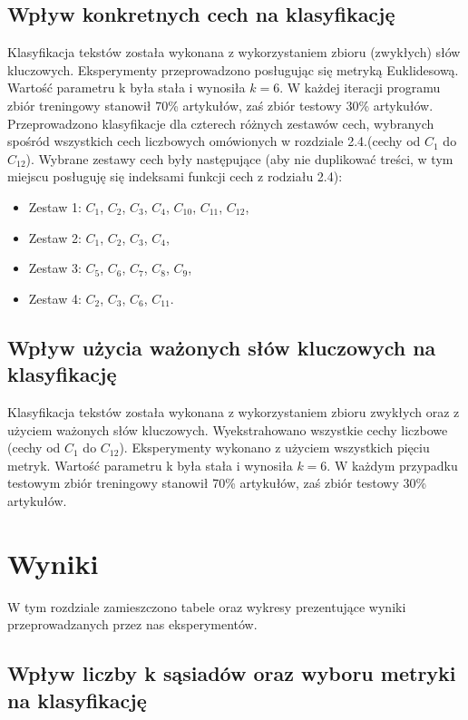 \documentclass{classrep}
\begin{document}
\subsection{Wpływ konkretnych cech na klasyfikację}
Klasyfikacja tekstów została wykonana z wykorzystaniem zbioru (zwykłych) słów kluczowych. Eksperymenty przeprowadzono posługując się metryką Euklidesową. Wartość parametru k była stała i wynosiła $k=6$. W każdej iteracji programu zbiór treningowy stanowił 70\% artykułów, zaś zbiór testowy 30\% artykułów. Przeprowadzono klasyfikacje dla czterech różnych zestawów cech, wybranych spośród wszystkich cech liczbowych omówionych w rozdziale 2.4.(cechy od $C_1$ do $C_{12}$). Wybrane zestawy cech były następujące (aby nie duplikować treści, w tym miejscu posługuję się indeksami funkcji cech z rodziału 2.4):
\begin{itemize}[label=$\bullet$\scshape\bfseries]

\item Zestaw 1: $C_{1}$,  $C_{2}$,  $C_{3}$,  $C_{4}$,  $C_{10}$,  $C_{11}$,  $C_{12}$,
\item Zestaw 2: $C_{1}$,  $C_{2}$,  $C_{3}$,  $C_{4}$,
\item Zestaw 3: $C_{5}$,  $C_{6}$,  $C_{7}$,  $C_{8}$,  $C_{9}$,
\item Zestaw 4: $C_{2}$,  $C_{3}$,  $C_{6}$,  $C_{11}$.
\end{itemize}

\subsection{Wpływ użycia ważonych słów kluczowych na klasyfikację}
Klasyfikacja tekstów została wykonana z wykorzystaniem zbioru zwykłych oraz z użyciem ważonych słów kluczowych. Wyekstrahowano wszystkie cechy liczbowe (cechy od $C_1$ do $C_{12}$). Eksperymenty wykonano z użyciem wszystkich pięciu metryk. Wartość parametru k była stała i wynosiła $k=6$. W każdym przypadku testowym zbiór treningowy stanowił 70\% artykułów, zaś zbiór testowy 30\% artykułów.

\section{Wyniki}
W tym rozdziale zamieszczono tabele oraz wykresy prezentujące wyniki przeprowadzanych przez nas eksperymentów.

\subsection{Wpływ liczby k sąsiadów oraz wyboru metryki na klasyfikację}
\end{document}
